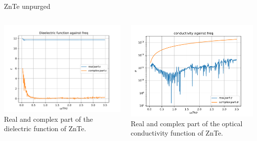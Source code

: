 \documentclass[aspectratio=1610, 9pt]{beamer}
\begin{document}
\begin{frame}{}
  ZnTe unpurged
  \begin{columns}
    \begin{column}{0.5\textwidth}
      \includegraphics[width=\textwidth]{images/ZnTe1mm_purged_nofilter/epsilon.pdf}
      {Real and complex part of the dielectric function of ZnTe.}
    \end{column} 
    \begin{column}{0.5\textwidth}
      \includegraphics[width=\textwidth]{images/ZnTe1mm_purged_nofilter/sigma.pdf}
      {Real and complex part of the optical conductivity function of ZnTe.}
    \end{column}
  \end{columns}
\end{frame}
\end{document}

